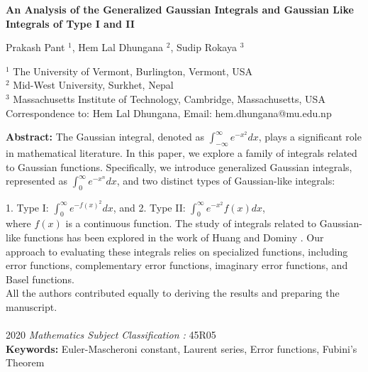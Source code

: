 \documentclass[a4paper,twoside,10pt]{article}
\begin{document}
\linenumbers
{\Large
\begin{center}
\bf{\LARGE An Analysis of the Generalized Gaussian Integrals and Gaussian Like Integrals of Type I and II}
\end{center}}
\begin{center}
Prakash Pant  $^{1}  $, Hem Lal Dhungana  $^{2}  $, Sudip Rokaya  $^{3}  $
\end{center}
\begin{center}
{\footnotesize
  $^{1}  $ The University of Vermont, Burlington, Vermont, USA \\
  $^{2}  $ Mid-West University, Surkhet, Nepal\\
  $^{3}  $ Massachusetts Institute of Technology, Cambridge, Massachusetts, USA
\\[1mm]
Correspondence to: Hem Lal Dhungana, Email: hem.dhungana@mu.edu.np
}
\end{center}
\noindent
\textbf{Abstract:} The Gaussian integral, denoted as \( \int_{-\infty}^{\infty} e^{-x^2} dx \), plays a significant role in mathematical literature. In this paper, we explore a family of integrals related to Gaussian functions. Specifically, we introduce generalized Gaussian integrals, represented as \( \int_{0}^{\infty} e^{-x^n} dx \), and two distinct types of Gaussian-like integrals: 

1. Type I: \( \int_{0}^{\infty} e^{-f(x)^2} dx \), and  
2. Type II: \( \int_{0}^{\infty} e^{-x^2} f(x) dx \),  \\
\noindent
where \( f(x) \) is a continuous function. The study of integrals related to Gaussian-like functions has been explored in the work  of Huang\cite{H2023} and Dominy \cite{Dnd}. Our approach to evaluating these integrals relies on specialized functions, including error functions, complementary error functions, imaginary error functions, and Basel functions.\\
All the authors contributed equally to deriving the results and preparing the manuscript.\\\\
2020\textit{ Mathematics Subject Classification :} 45R05 \\
\textbf{Keywords:} Euler-Mascheroni constant, Laurent series, Error functions, Fubini's Theorem
\\ \\
\end{document}
